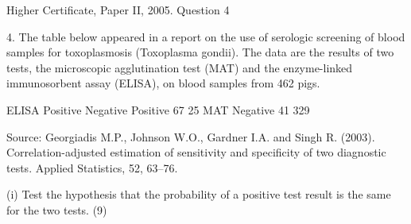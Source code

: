 \documentclass[a4paper,12pt]{article}
\begin{document}
Higher Certificate, Paper II, 2005. Question 4
\begin{framed}


4. The table below appeared in a report on the use of serologic screening of blood samples for toxoplasmosis (Toxoplasma gondii).  The data are the results of two tests, the microscopic agglutination test (MAT) and the enzyme-linked immunosorbent assay (ELISA), on blood samples from 462 pigs. 
 
  ELISA   Positive Negative Positive 67   25 MAT Negative 41 329 
 
Source:  Georgiadis M.P., Johnson W.O., Gardner I.A. and Singh R. (2003).  Correlation-adjusted estimation of sensitivity and specificity of two diagnostic tests.  Applied Statistics, 52, 63–76. 
 
 
(i) Test the hypothesis that the probability of a positive test result is the same for the two tests. (9) 
 

 
 
\end{framed}
\end{document}
